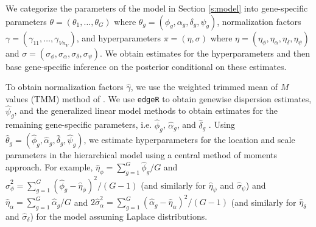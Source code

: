 \documentclass[useAMS,usenatbib,referee]{biom}
\newcommand{\edgeR}{{\tt edgeR}}
\begin{document}
We categorize the parameters of the model in Section \ref{s:model} into gene-specific parameters $\theta = (\theta_1,\ldots,\theta_G)$ where $\theta_g = (\phi_g,\alpha_g,\delta_g,\psi_g)$, normalization factors $\gamma = (\gamma_{11},\ldots,\gamma_{Vn_V})$, and hyperparameters $\pi = (\eta, \sigma)$ where $\eta=(\eta_\phi,\eta_\alpha,\eta_\delta, \eta_\psi)$ and $\sigma=(\sigma_\phi,\sigma_\alpha,\sigma_\delta,\sigma_\psi)$. We obtain estimates for the hyperparameters and then base gene-specific inference on the posterior conditional on these estimates. 

To obtain normalization factors $\hat{\gamma}$, we use the weighted trimmed mean of $M$ values (TMM) method of \cite{robinson2010scaling}. We use \edgeR{} to obtain genewise dispersion estimates, $\hat{\psi}_g$, and the generalized linear model methods to obtain estimates for the remaining gene-specific parameters, i.e. $\hat{\phi}_g$, $\hat{\alpha}_g$, and $\hat{\delta}_g$ \citep{robinson2010edgeR}. Using $\hat{\theta}_g = (\hat{\phi}_g,\hat{\alpha}_g,\hat{\delta}_g,\hat{\psi}_g)$, we estimate hyperparameters for the location and scale parameters in the hierarchical model using a central method of moments approach. For example, $\hat{\eta}_\phi = \sum_{g=1}^G \hat{\phi}_g/G$ and $\hat{\sigma}_\phi^2 = \sum_{g=1}^G (\hat{\phi}_g - \hat{\eta}_\phi)^2/(G-1)$ (and similarly for $\hat{\eta}_\psi$ and $\hat{\sigma}_\psi$) and $\hat{\eta}_\alpha = \sum_{g=1}^G \hat{\alpha}_g/G$ and $2\hat{\sigma}_\alpha^2 = \sum_{g=1}^G (\hat{\alpha}_g - \hat{\eta}_\alpha)^2/(G-1)$ (and similarly for $\hat{\eta}_\delta$ and $\hat{\sigma}_\delta$) for the model assuming Laplace distributions. 
\end{document}
